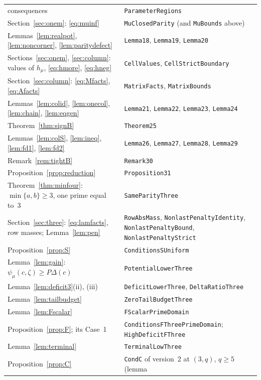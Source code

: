 \documentclass[11pt]{article}
\theoremstyle{remark}
\begin{document}
\begin{table}[ht]
\begin{tabular}{@{}>{\raggedright\arraybackslash}p{}
 >{\raggedright\arraybackslash}p{}@{}}
 consequences & \texttt{ParameterRegions}\\
Section~\ref{sec:onem}: \eqref{eq:muinf} & \texttt{MuClosedParity} (and \texttt{MuBounds} above)\\
Lemmas~\ref{lem:realpot}, \ref{lem:noncorner}, \ref{lem:paritydefect} &
 \texttt{Lemma18}, \texttt{Lemma19}, \texttt{Lemma20}\\
Sections~\ref{sec:onem}, \ref{sec:column}: values of $h_\mu$, \eqref{eq:hmore},
 \eqref{eq:hneg} & \texttt{CellValues}, \texttt{CellStrictBoundary}\\
Section~\ref{sec:column}: \eqref{eq:Mfacts}, \eqref{eq:Afacts} &
 \texttt{MatrixFacts}, \texttt{MatrixBounds}\\
Lemmas~\ref{lem:colid}, \ref{lem:onecol}, \ref{lem:chain}, \ref{lem:eqgen} &
 \texttt{Lemma21}, \texttt{Lemma22}, \texttt{Lemma23}, \texttt{Lemma24}\\
Theorem~\ref{thm:signB} & \texttt{Theorem25}\\
Lemmas~\ref{lem:colS}, \ref{lem:ineq}, \ref{lem:fd1}, \ref{lem:fd2} &
 \texttt{Lemma26}, \texttt{Lemma27}, \texttt{Lemma28}, \texttt{Lemma29}\\
Remark~\ref{rem:tightB} & \texttt{Remark30}\\
Proposition~\ref{prop:reduction} & \texttt{Proposition31}\\
\midrule
Theorem~\ref{thm:minfour}: $\min\{a,b\}\ge3$, one prime equal to~$3$ &
 \texttt{SameParityThree}\\
Section~\ref{sec:three}: \eqref{eq:lamfacts}, row masses; Lemma~\ref{lem:pen} &
 \texttt{RowAbsMass}, \texttt{NonlastPenaltyIdentity}, \texttt{NonlastPenaltyBound},
 \texttt{NonlastPenaltyStrict}\\
Proposition~\ref{prop:S} & \texttt{ConditionsSUniform}\\
Lemma~\ref{lem:gain}: $\psi_\mu(c,\zeta)\ge P\Delta(c)$ & \texttt{PotentialLowerThree}\\
Lemma~\ref{lem:deficit3}(ii), (iii) & \texttt{DeficitLowerThree},
 \texttt{DeltaRatioThree}\\
Lemma~\ref{lem:tailbudget} & \texttt{ZeroTailBudgetThree}\\
Lemma~\ref{lem:Fscalar} & \texttt{FScalarPrimeDomain}\\
Proposition~\ref{prop:F}; its Case~1 & \texttt{ConditionsFThreePrimeDomain};
 \texttt{HighDeficitFThree}\\
Lemma~\ref{lem:terminal} & \texttt{TerminalLowThree}\\
Proposition~\ref{prop:C} & \texttt{CondC} of version~2 at $(3,q)$, $q\ge5$ (lemma

\end{tabular}
\end{table}
\end{document}
